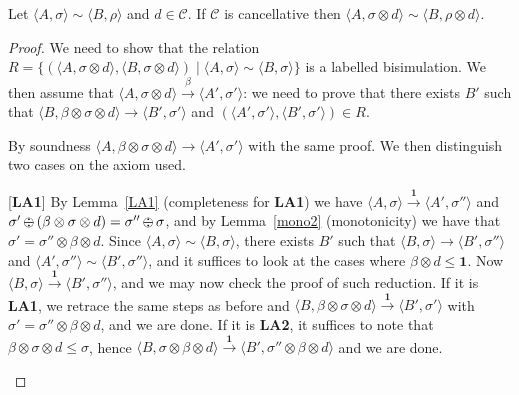 \documentclass{llncs}
\def\monid{{\mathbf 0}}
\def\odiv{\, {\ominus\hspace{-7.7pt} \div} \,}
\def\monid{\mathbf{1}}
\begin{document}
{\setcounter{proposition}{1}
\begin{proposition}
	Let $\langle A,\sigma \rangle \sim \langle B,\rho \rangle$ and $d \in \mathcal{C}$.
	If  $\mathcal{C}$ is cancellative then $\langle A,\sigma \otimes d\rangle \sim \langle B,\rho \otimes d \rangle$.
\end{proposition}
\begin{proof}
	We need to show that the relation 
	$R = \{ (\langle A,\sigma \otimes d \rangle, \langle B,\sigma \otimes d \rangle) \mid \langle A,\sigma \rangle \sim \langle B,\sigma \rangle\}$
	is a labelled bisimulation. We then assume that 
	$\langle A, \sigma \otimes d \rangle  \xrightarrow{\beta} \langle A', \sigma' \rangle$: 
	we need to prove that there exists $B'$ such that
	$\langle B,\beta \otimes  \sigma \otimes d \rangle  \xrightarrow{} \langle B', \sigma' \rangle$ 
	and $(\langle A', \sigma' \rangle, \langle B', \sigma' \rangle) \in R$.
	
	By soundness 
	$\langle A, \beta \otimes  \sigma \otimes d \rangle  \xrightarrow{}\langle A', \sigma' \rangle$
	with the same proof.
	We then distinguish two cases on the 
	axiom used.
	
	\begin{description}
		\item{[{\bf LA1}]}
		By Lemma~\ref{LA1} (completeness for {\bf LA1}) we have $\langle A,  \sigma \rangle  \xrightarrow{\monid}\langle A', \sigma'' \rangle$
		and $\sigma' \odiv (\beta \otimes \sigma \otimes d) = \sigma'' \odiv \sigma$, and by Lemma~\ref{mono2} (monotonicity)
		we have that $\sigma' = \sigma'' \otimes \beta \otimes d$.
		Since $\langle A,\sigma \rangle \sim \langle B,\sigma \rangle$, 
		there exists $B'$ such that 
		$\langle B, \sigma \rangle \xrightarrow{} \langle B', \sigma'' \rangle$
		and $\langle A', \sigma'' \rangle \sim \langle B', \sigma'' \rangle$,
		and it suffices to look at the cases where $\beta \otimes d \leq \monid$.
		Now $\langle B, \sigma \rangle \xrightarrow{\monid} \langle B', \sigma'' \rangle$, and we may now check the proof of
		such reduction.
		If it is  {\bf LA1}, we retrace the same steps as before and 
		$\langle B, \beta \otimes  \sigma \otimes d \rangle  \xrightarrow{\monid} \langle B', \sigma' \rangle$
		with $\sigma' = \sigma'' \otimes \beta \otimes d$, and we are done.
		If it is  {\bf LA2}, it suffices to note that $\beta \otimes \sigma \otimes d\leq \sigma$,
		hence $\langle B, \sigma \otimes \beta \otimes d \rangle \xrightarrow{\monid} \langle B', \sigma'' \otimes \beta \otimes d\rangle$
		and we are done.
		

\end{description}
\end{proof}}
\end{document}
